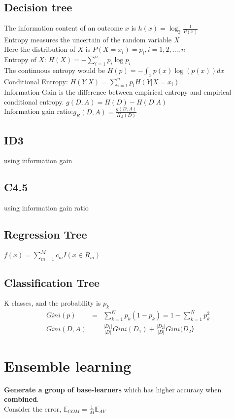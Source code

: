 \documentclass[12pt,a4paper]{article}
\begin{document}
\subsection*{Decision tree}
The information content of an outcome $x$ is $h(x) = \log_2\frac{1}{P(x)}$\\
Entropy measures the uncertain of the random variable $X$\\
Here the distribution of $X$ is $P(X=x_i)=p_i, i=1,2,\ldots,n$ \\
Entropy of $X$: $H(X) = -\sum_{i=1}^{n}p_i\log p_i$ \\
The continuous entropy would be $H(p)=-\int_xp(x)\log(p(x))dx$\\
Conditional Entropy: $H(Y|X)=\sum_{i=1}^{n}p_iH(Y|X=x_i)$ \\
Information Gain is the difference between empirical entropy and empirical conditional entropy.
$g(D,A) = H(D)-H(D|A)$\\
Information gain ratio:$g_R(D,A)=\frac{g(D,A)}{H_A(D)}$
\subsection*{ID3}
using information gain
\subsection*{C4.5}
using information gain ratio
\subsection*{Regression Tree}
$f(x)=\sum_{m=1}^{M}c_mI(x\in R_m)$
\subsection*{Classification Tree}
K classes, and the probability is $p_k$\\
\begin{eqnarray*}
Gini(p) &=& \sum_{k=1}^{K}p_k(1-p_k)=1-\sum_{k=1}^{K}p_k^2\\
Gini(D,A) &=& \frac{|D_1|}{|D|}Gini(D_1)+\frac{|D_2|}{|D|}Gini(D_2）
\end{eqnarray*}
\section*{Ensemble learning}
\textbf{Generate a group of base-learners} which has higher accuracy when \textbf{combined}.\\
Consider the error, $\mathbb{E}_{COM} = \frac{1}{M}\mathbb{E}_{AV}$
\end{document}
